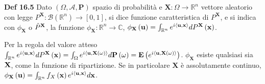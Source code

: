 \documentclass{article}
\begin{document}
\textbf{Def 16.5} Dato $\left( \Omega ,\mathcal{A},\mathbf{P}\right) $
spazio di probabilit\`{a} e $\mathbf{X}:\Omega \rightarrow 
\mathbb{R}
^{n}$ vettore aleatorio con legge $P^{\mathbf{X}}:\mathcal{B}\left( 
\mathbb{R}
^{n}\right) \rightarrow \left[ 0,1\right] $, si dice funzione caratteristica
di $P^{\mathbf{X}}$, e si indica con $\phi _{\mathbf{X}}$ o $\hat{P}^{%
\mathbf{X}}$, la funzione $\phi _{\mathbf{X}}:%
\mathbb{R}
^{n}\rightarrow 
\mathbb{C}
$, $\phi _{\mathbf{X}}\left( \mathbf{u}\right) =\int_{%
\mathbb{R}
^{n}}e^{i\left\langle \mathbf{u},\mathbf{x}\right\rangle }dP^{\mathbf{X}%
}\left( \mathbf{x}\right) $.

Per la regola del valore atteso $\int_{%
\mathbb{R}
^{n}}e^{i\left\langle \mathbf{u},\mathbf{x}\right\rangle }dP^{\mathbf{X}%
}\left( \mathbf{x}\right) =\int_{\Omega }e^{i\left\langle \mathbf{u},\mathbf{%
X}\left( \omega \right) \right\rangle }d\mathbf{P}\left( \omega \right) =%
\mathbf{E}\left( e^{i\left\langle \mathbf{u,X}\left( \omega \right)
\right\rangle }\right) $. $\phi _{\mathbf{X}}$ esiste qualsiasi sia $\mathbf{%
X}$, come la funzione di ripartizione. Se in particolare $\mathbf{X}$ \`{e}
assolutamente continuo, $\phi _{\mathbf{X}}\left( \mathbf{u}\right) =\int_{%
\mathbb{R}
^{n}}f_{X}\left( \mathbf{x}\right) e^{i\left\langle \mathbf{u},\mathbf{x}%
\right\rangle }d\mathbf{x}$.
\end{document}
